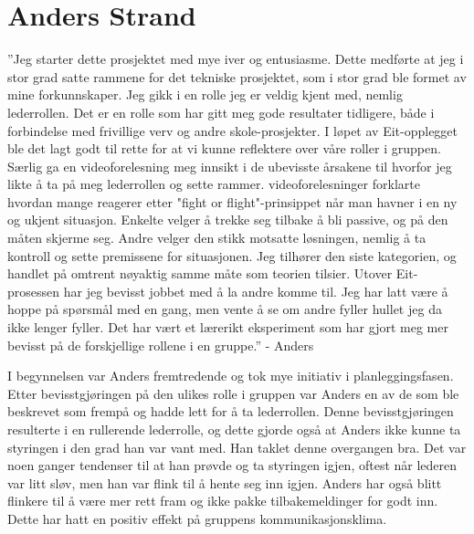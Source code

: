\section{Anders Strand}
''Jeg starter dette prosjektet med mye iver og entusiasme. 
Dette medførte at jeg i stor grad satte rammene for det tekniske prosjektet, som i stor grad ble formet av mine forkunnskaper.
Jeg gikk i en rolle jeg er veldig kjent med, nemlig lederrollen. 
Det er en rolle som har gitt meg gode resultater tidligere, både i forbindelse med frivillige verv og andre skole-prosjekter.
I løpet av Eit-opplegget ble det lagt godt til rette for at vi kunne reflektere over våre roller i gruppen.
Særlig ga en videoforelesning meg innsikt i de ubevisste årsakene til hvorfor jeg likte å ta på meg lederrollen og sette rammer. 
videoforelesninger forklarte hvordan mange reagerer etter "fight or flight"-prinsippet når man havner i en ny og ukjent situasjon.
Enkelte velger å trekke seg tilbake å bli passive, og på den måten skjerme seg. 
Andre velger den stikk motsatte løsningen, nemlig å ta kontroll og sette premissene for situasjonen. 
Jeg tilhører den siste kategorien, og handlet på omtrent nøyaktig samme måte som teorien tilsier.
Utover Eit-prosessen har jeg bevisst jobbet med å la andre komme til.
Jeg har latt være å hoppe på spørsmål med en gang, men vente å se om andre fyller hullet jeg da ikke lenger fyller. Det har vært et lærerikt eksperiment som har gjort meg mer bevisst på de forskjellige rollene i en gruppe.'' \hfill - Anders
\vspace{\secspace}

I begynnelsen var Anders fremtredende og tok mye initiativ i planleggingsfasen. 
Etter bevisstgjøringen på den ulikes rolle i gruppen var Anders en av de som ble beskrevet som frempå og hadde lett for å ta lederrollen. 
Denne bevisstgjøringen resulterte i en rullerende lederrolle, og dette gjorde også at Anders ikke kunne ta styringen i den grad han var vant med. 
Han taklet denne overgangen bra. 
Det var noen ganger tendenser til at han prøvde og ta styringen igjen, oftest når lederen var litt sløv, men han var flink til å hente seg inn igjen. 
Anders har også blitt flinkere til å være mer rett fram og ikke pakke tilbakemeldinger for godt inn. 
Dette har hatt en positiv effekt på gruppens kommunikasjonsklima. 
